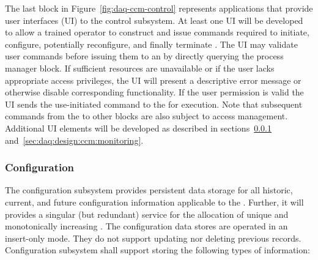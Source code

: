 The last block in Figure~\ref{fig:daq-ccm-control} represents applications that provide user interfaces (UI) to the control subsystem.
At least one UI will be developed to allow a trained operator to construct and issue commands required to initiate, configure, potentially reconfigure, and finally terminate . 
The UI may validate user commands before issuing them to an  by directly querying the process manager block. 
If sufficient resources are unavailable or if the user lacks appropriate access privileges, the UI will present a descriptive error message or otherwise disable corresponding functionality.  
If the user permission is valid the UI sends the use-initiated command to the  for execution.
Note that subsequent commands from the  to other blocks are also subject to access management.
Additional UI elements will be developed as described in sections~\ref{sec:daq:design:ccm:configuration} and~\ref{sec:daq:design:ccm:monitoring}.


\subsubsection{Configuration}
\label{sec:daq:design:ccm:configuration}

The  configuration subsystem provides persistent data storage for all historic, current, and future configuration information applicable to the .
Further, it will provides a singular (but redundant) service for the allocation of unique and monotonically increasing .
The configuration data stores are operated in an insert-only mode. 
They do not support updating nor deleting previous records.
Configuration subsystem  shall support storing the following types of information:

